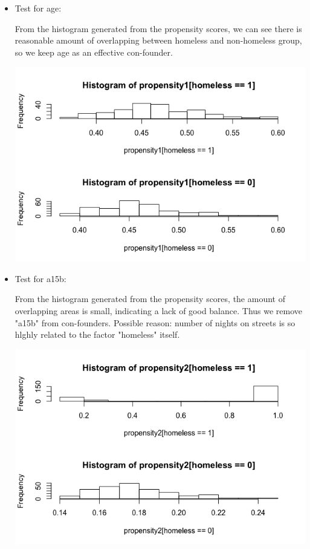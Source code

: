 \documentclass{report}
\begin{document}
\begin{itemize}
    \item Test for age:\\
    \begin{minipage}{0.5\linewidth}
         From the histogram generated from the propensity scores, we can see there is reasonable amount of overlapping between homeless and non-homeless group, so we keep age as an effective con-founder.
    \end{minipage}
    \begin{minipage}{0.5\linewidth}
        \centering
        \includegraphics[scale=0.25]{1.jpg}
    \end{minipage}
    \item Test for a15b:\\
    \begin{minipage}{0.5\linewidth}
         From the histogram generated from the propensity scores, the amount of overlapping areas is small, indicating a lack of good balance. Thus we remove "a15b" from con-founders. Possible reason: number of nights on streets is so hlghly related to the factor "homeless" itself.
    \end{minipage}
    \begin{minipage}{0.5\linewidth}
        \centering
        \includegraphics[scale=0.25]{2.png}

\end{minipage}
\end{itemize}
\end{document}
